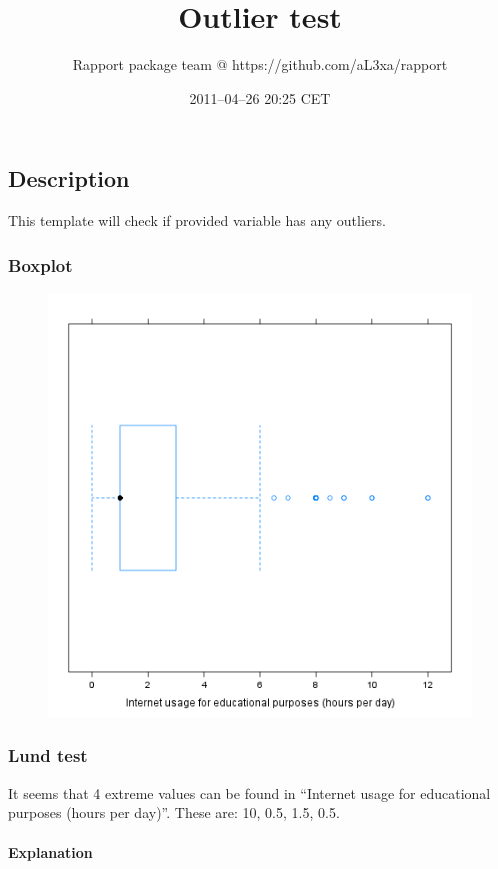\documentclass{article}
\title{Outlier test}
\author{Rapport package team @ https://github.com/aL3xa/rapport}
\date{2011--04--26 20:25 CET}
\makeatletter
\def\maxwidth{\ifdim\Gin@nat@width>\linewidth\linewidth
\else\Gin@nat@width\fi}
\let\Oldincludegraphics\includegraphics
\renewcommand{\includegraphics}[1]{\Oldincludegraphics[width=\maxwidth]{#1}}
\makeatother
\begin{document}
\maketitle

\subsection{Description}

This template will check if provided variable has any outliers.

\subsubsection{Boxplot}

\begin{figure}[htbp]
\centering
\includegraphics{d24b3eb41da4d1de21d4bce0e30d2e1b.png}
\caption{}
\end{figure}

\subsubsection{Lund test}

It seems that 4 extreme values can be found in ``Internet usage for
educational purposes (hours per day)''. These are: 10, 0.5, 1.5, 0.5.

\paragraph{Explanation}
\end{document}

